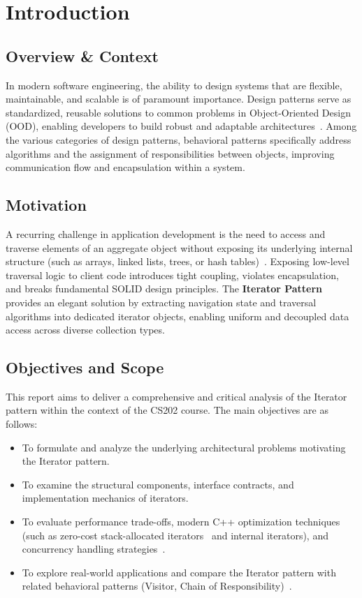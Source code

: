 \section{Introduction}

\subsection{Overview \& Context}
In modern software engineering, the ability to design systems that are flexible, maintainable, and scalable is of paramount importance. Design patterns serve as standardized, reusable solutions to common problems in Object-Oriented Design (OOD), enabling developers to build robust and adaptable architectures~\cite{gof1994}. Among the various categories of design patterns, behavioral patterns specifically address algorithms and the assignment of responsibilities between objects, improving communication flow and encapsulation within a system.

\subsection{Motivation}
A recurring challenge in application development is the need to access and traverse elements of an aggregate object without exposing its underlying internal structure (such as arrays, linked lists, trees, or hash tables)~\cite{gof1994, refactoring_guru_iterator}. Exposing low-level traversal logic to client code introduces tight coupling, violates encapsulation, and breaks fundamental SOLID design principles. The \textbf{Iterator Pattern}~\cite{gof1994} provides an elegant solution by extracting navigation state and traversal algorithms into dedicated iterator objects, enabling uniform and decoupled data access across diverse collection types.

\subsection{Objectives and Scope}
This report aims to deliver a comprehensive and critical analysis of the Iterator pattern within the context of the CS202 course. The main objectives are as follows:
\begin{itemize}
    \item To formulate and analyze the underlying architectural problems motivating the Iterator pattern.
    \item To examine the structural components, interface contracts, and implementation mechanics of iterators.
    \item To evaluate performance trade-offs, modern C++ optimization techniques (such as zero-cost stack-allocated iterators~\cite{stroustrup2013, meyers2014} and internal iterators), and concurrency handling strategies~\cite{williams2019, iso_cpp20}.
    \item To explore real-world applications and compare the Iterator pattern with related behavioral patterns (Visitor, Chain of Responsibility)~\cite{gof1994}.
\end{itemize}

